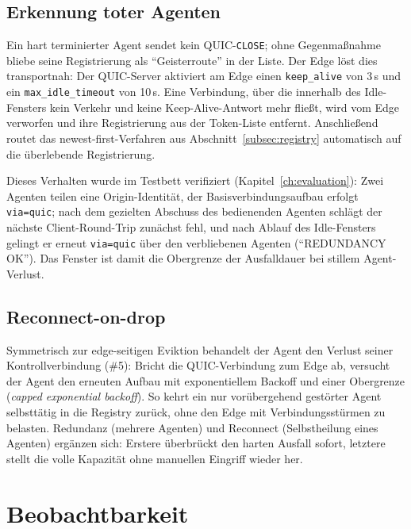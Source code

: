 \subsection{Erkennung toter Agenten}
\label{subsec:deadagent}

Ein hart terminierter Agent sendet kein QUIC-\texttt{CLOSE}; ohne Gegenmaßnahme
bliebe seine Registrierung als \enquote{Geisterroute} in der Liste. Der Edge
löst dies transportnah: Der QUIC-Server aktiviert am Edge einen
\texttt{keep\_alive} von 3\,s und ein \texttt{max\_idle\_timeout} von 10\,s.
Eine Verbindung, über die innerhalb des Idle-Fensters kein Verkehr und keine
Keep-Alive-Antwort mehr fließt, wird vom Edge verworfen und ihre Registrierung
aus der Token-Liste entfernt. Anschließend routet das newest-first-Verfahren aus
Abschnitt~\ref{subsec:registry} automatisch auf die überlebende Registrierung.

Dieses Verhalten wurde im Testbett verifiziert
(Kapitel~\ref{ch:evaluation}): Zwei Agenten teilen eine Origin-Identität, der
Basisverbindungsaufbau erfolgt \texttt{via=quic}; nach dem gezielten Abschuss
des bedienenden Agenten schlägt der nächste Client-Round-Trip zunächst fehl, und
nach Ablauf des Idle-Fensters gelingt er erneut \texttt{via=quic} über den
verbliebenen Agenten (\enquote{REDUNDANCY OK}). Das Fenster ist damit die
Obergrenze der Ausfalldauer bei stillem Agent-Verlust.

\subsection{Reconnect-on-drop}
\label{subsec:reconnect}

Symmetrisch zur edge-seitigen Eviktion behandelt der Agent den Verlust seiner
Kontrollverbindung (\#5): Bricht die QUIC-Verbindung zum Edge ab, versucht der
Agent den erneuten Aufbau mit exponentiellem Backoff und einer Obergrenze
(\emph{capped exponential backoff}). So kehrt ein nur vorübergehend gestörter
Agent selbsttätig in die Registry zurück, ohne den Edge mit Verbindungsstürmen
zu belasten. Redundanz (mehrere Agenten) und Reconnect (Selbstheilung eines
Agenten) ergänzen sich: Erstere überbrückt den harten Ausfall sofort, letztere
stellt die volle Kapazität ohne manuellen Eingriff wieder her.

\section{Beobachtbarkeit}
\label{sec:observability}

